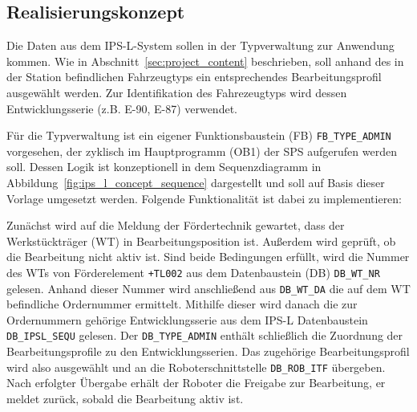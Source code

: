\subsection{Realisierungskonzept}
\label{subsec:ips_l_concept}

Die Daten aus dem IPS-L-System sollen in der Typverwaltung zur Anwendung kommen. Wie in Abschnitt~\ref{sec:project_content} beschrieben, soll anhand des in der Station befindlichen Fahrzeugtyps ein entsprechendes Bearbeitungsprofil ausgewählt werden. Zur Identifikation des Fahrezeugtyps wird dessen Entwicklungsserie (z.B. E-90, E-87) verwendet.


Für die Typverwaltung ist ein eigener Funktionsbaustein (FB) \texttt{FB\_TYPE\_ADMIN} vorgesehen, der zyklisch im Hauptprogramm (OB1) der SPS aufgerufen werden soll. Dessen Logik ist konzeptionell in dem Sequenzdiagramm in Abbildung~\ref{fig:ips_l_concept_sequence} dargestellt und soll auf Basis dieser Vorlage umgesetzt werden. Folgende Funktionalität ist dabei zu implementieren:\par

Zunächst wird auf die Meldung der Fördertechnik gewartet, dass der Werkstückträger (WT) in Bearbeitungsposition ist. Außerdem wird geprüft, ob die Bearbeitung nicht aktiv ist. Sind beide Bedingungen erfüllt, wird die Nummer des WTs von Förderelement \texttt{+TL002} aus dem Datenbaustein (DB) \texttt{DB\_WT\_NR} gelesen. Anhand dieser Nummer wird anschließend aus \texttt{DB\_WT\_DA} die auf dem WT befindliche Ordernummer ermittelt. Mithilfe dieser wird danach die zur Ordernummern gehörige Entwicklungsserie aus dem IPS-L Datenbaustein \texttt{DB\_IPSL\_SEQU} gelesen. Der \texttt{DB\_TYPE\_ADMIN} enthält schließlich die Zuordnung der Bearbeitungsprofile zu den Entwicklungsserien. Das zugehörige Bearbeitungsprofil wird also ausgewählt und an die Roboterschnittstelle \texttt{DB\_ROB\_ITF} übergeben. Nach erfolgter Übergabe erhält der Roboter die Freigabe zur Bearbeitung, er meldet zurück, sobald die Bearbeitung aktiv ist. 




